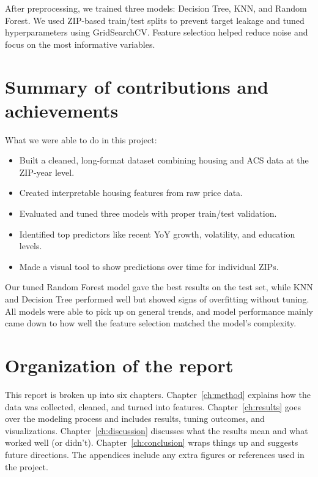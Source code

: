After preprocessing, we trained three models: Decision Tree, KNN, and Random Forest. We used ZIP-based train/test splits to prevent target leakage and tuned hyperparameters using GridSearchCV. Feature selection helped reduce noise and focus on the most informative variables.

\section{Summary of contributions and achievements}
\label{sec:intro_sum_results}

What we were able to do in this project:
\begin{itemize}
    \item Built a cleaned, long-format dataset combining housing and ACS data at the ZIP-year level.
    \item Created interpretable housing features from raw price data.
    \item Evaluated and tuned three models with proper train/test validation.
    \item Identified top predictors like recent YoY growth, volatility, and education levels.
    \item Made a visual tool to show predictions over time for individual ZIPs.
\end{itemize}

Our tuned Random Forest model gave the best results on the test set, while KNN and Decision Tree performed well but showed signs of overfitting without tuning. All models were able to pick up on general trends, and model performance mainly came down to how well the feature selection matched the model’s complexity.

\section{Organization of the report}
\label{sec:intro_org}

This report is broken up into six chapters. Chapter~\ref{ch:method} explains how the data was collected, cleaned, and turned into features. Chapter~\ref{ch:results} goes over the modeling process and includes results, tuning outcomes, and visualizations. Chapter~\ref{ch:discussion} discusses what the results mean and what worked well (or didn’t). Chapter~\ref{ch:conclusion} wraps things up and suggests future directions. The appendices include any extra figures or references used in the project.
